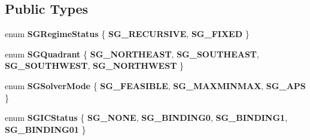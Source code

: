 \subsection*{Public Types}
\begin{DoxyCompactItemize}
\item 
\mbox{\label{classSGSolver__MaxMinMax__GRB_a5abb38704065b644693b39fc670618da}} 
enum {\bfseries S\+G\+Regime\+Status} \{ {\bfseries S\+G\+\_\+\+R\+E\+C\+U\+R\+S\+I\+VE}, 
{\bfseries S\+G\+\_\+\+F\+I\+X\+ED}
 \}
\item 
\mbox{\label{classSGSolver__MaxMinMax__GRB_ab64c70bfacff74dd01a331ab41fb3cf1}} 
enum {\bfseries S\+G\+Quadrant} \{ {\bfseries S\+G\+\_\+\+N\+O\+R\+T\+H\+E\+A\+ST}, 
{\bfseries S\+G\+\_\+\+S\+O\+U\+T\+H\+E\+A\+ST}, 
{\bfseries S\+G\+\_\+\+S\+O\+U\+T\+H\+W\+E\+ST}, 
{\bfseries S\+G\+\_\+\+N\+O\+R\+T\+H\+W\+E\+ST}
 \}
\item 
\mbox{\label{classSGSolver__MaxMinMax__GRB_a8cec9c6b4227da7833f90adff3f78ed7}} 
enum {\bfseries S\+G\+Solver\+Mode} \{ {\bfseries S\+G\+\_\+\+F\+E\+A\+S\+I\+B\+LE}, 
{\bfseries S\+G\+\_\+\+M\+A\+X\+M\+I\+N\+M\+AX}, 
{\bfseries S\+G\+\_\+\+A\+PS}
 \}
\item 
\mbox{\label{classSGSolver__MaxMinMax__GRB_a3e356705cd16fcc26d9987b0ac6d14c0}} 
enum {\bfseries S\+G\+I\+C\+Status} \{ {\bfseries S\+G\+\_\+\+N\+O\+NE}, 
{\bfseries S\+G\+\_\+\+B\+I\+N\+D\+I\+N\+G0}, 
{\bfseries S\+G\+\_\+\+B\+I\+N\+D\+I\+N\+G1}, 
{\bfseries S\+G\+\_\+\+B\+I\+N\+D\+I\+N\+G01}
 \}
\end{DoxyCompactItemize}

